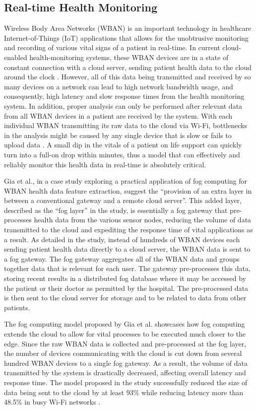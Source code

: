 \documentclass{article}
\begin{document}
\subsection{Real-time Health Monitoring}
Wireless Body Area Networks (WBAN) is an important technology in healthcare Internet-of-Things (IoT) applications that allows for the unobtrusive monitoring and recording of various vital signs of a patient in real-time. In current cloud-enabled health-monitoring systems, these WBAN devices are in a state of constant connection with a cloud server, sending patient health data to the cloud around the clock \cite{gia2015fog}. However, all of this data being transmitted and received by so many devices on a network can lead to high network bandwidth usage, and consequently, high latency and slow response times from the health monitoring system. In addition, proper analysis can only be performed after relevant data from all WBAN devices in a patient are received by the system. With each individual WBAN transmitting its raw data to the cloud via Wi-Fi, bottlenecks in the analysis might be caused by any single device that is slow or fails to upload data \cite{gia2015fog}. A small dip in the vitals of a patient on life support can quickly turn into a full-on drop within minutes, thus a model that can effectively and reliably monitor this health data in real-time is absolutely critical.

Gia et al., in a case study exploring a practical application of fog computing for WBAN health data feature extraction,  suggest the ``provision of an extra layer in between a conventional gateway and a remote cloud server''\cite{gia2015fog}. This added layer, described as the ``fog layer'' in the study, is essentially a fog gateway that pre-processes health data from the various sensor nodes, reducing the volume of data transmitted to the cloud and expediting the response time of vital applications as a result. As detailed in the study, instead of hundreds of WBAN devices each sending patient health data directly to a cloud server, the WBAN data is sent to a fog gateway. The fog gateway aggregates all of the WBAN data and groups together data that is relevant for each user. The gateway pre-processes this data, storing recent results in a distributed fog database where it may be accessed by the patient or their doctor as permitted by the hospital. The pre-processed data is then sent to the cloud server for storage and to be related to data from other patients.

The fog computing model proposed by Gia et al. showcases how fog computing extends the cloud to allow for vital processes to be executed much closer to the edge. Since the raw WBAN data is collected and pre-processed at the fog layer, the number of devices communicating with the cloud is cut down from several hundred WBAN devices to a single fog gateway. As a result, the volume of data transmitted by the system is drastically decreased, affecting overall latency and response time. The model proposed in the study successfully reduced the size of data being sent to the cloud by at least 93\% while reducing latency more than 48.5\% in busy Wi-Fi networks \cite{gia2015fog}. 
\end{document}
